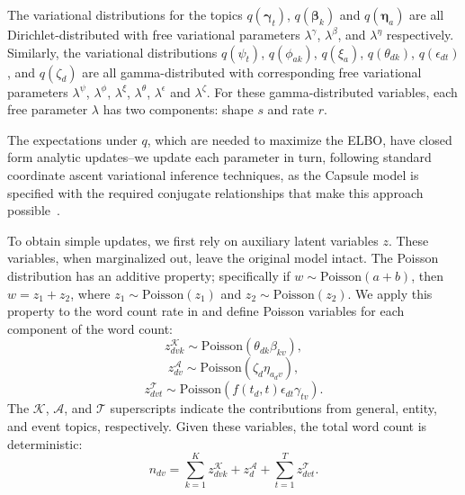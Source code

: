The variational distributions for the topics $q(\mathbold{\gamma}_t)$, $q(\mathbold{\beta}_k)$ and $q(\mathbold{\eta}_a)$ are all Dirichlet-distributed with free variational parameters $\lambda^\gamma$, $\lambda^\beta$, and $\lambda^\eta$ respectively.  Similarly, the variational distributions $q(\psi_t)$, $q(\phi_{ak})$, $q(\xi_a)$, $q(\theta_{dk})$, $q(\epsilon_{dt})$, and $q(\zeta_d)$ are all gamma-distributed with corresponding free variational parameters $\lambda^\psi$, $\lambda^\phi$, $\lambda^\xi$, $\lambda^\theta$, $\lambda^\epsilon$ and $\lambda^\zeta$.  For these gamma-distributed variables, each free parameter $\lambda$ has two components: shape $s$ and rate $r$.

The expectations under $q$, which are needed to maximize the ELBO, have closed form analytic updates--we update each parameter in turn, following standard coordinate ascent variational inference techniques, as the Capsule model is specified with the required conjugate relationships that make this approach possible~\cite{Ghahramani:2001}.


To obtain simple updates, we first rely on auxiliary latent variables $z$. These variables, when marginalized out, leave the original model intact. The Poisson distribution has an additive property; specifically if $w \sim \mbox{Poisson}(a+b)$, then $w = z_1 + z_2$, where $z_1 \sim \mbox{Poisson}(z_1)$ and $z_2 \sim \mbox{Poisson}(z_2)$.  We apply this property to the word count rate in  and define Poisson variables for each component of the word count:
\[ z^\mathcal{K}_{dvk} \sim \mbox{Poisson}(\theta_{dk}\beta_{kv}), \]
\[ z^\mathcal{A}_{dv} \sim \mbox{Poisson}(\zeta_{d}\eta_{a_dv}), \]
\[ z^\mathcal{T}_{dvt} \sim \mbox{Poisson}\left(f(t_d, t) \epsilon_{dt} \gamma_{tv}\right). \]
The $\mathcal{K}$, $\mathcal{A}$, and $\mathcal{T}$ superscripts indicate the contributions from general, entity, and event topics, respectively.  Given these variables, the total word count is deterministic:
\[ n_{dv} = \sum_{k=1}^K z^\mathcal{K}_{dvk} + z^\mathcal{A}_{d} + \sum_{t=1}^T z^\mathcal{T}_{dvt}. \]

